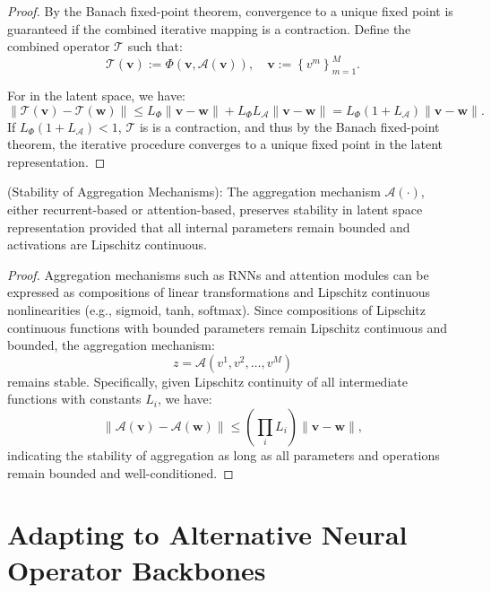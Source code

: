\begin{proof}
	By the Banach fixed-point theorem, convergence to a unique fixed point is guaranteed if the combined iterative mapping is a contraction. Define the combined operator $\mathcal{T}$ such that:
	\[
		\mathcal{T}(\mathbf{v}):=\Phi(\mathbf{v}, \mathcal{A}(\mathbf{v})), \quad \mathbf{v}:=\left\{v^m\right\}_{m=1}^M .
	\]
	
	For  in the latent space, we have:
	\[
		\|\mathcal{T}(\mathbf{v})-\mathcal{T}(\mathbf{w})\| \leq L_{\Phi}\|\mathbf{v}-\mathbf{w}\|+L_{\Phi} L_{\mathcal{A}}\|\mathbf{v}-\mathbf{w}\|=L_{\Phi}\left(1+L_{\mathcal{A}}\right)\|\mathbf{v}-\mathbf{w}\| .
	\]
	If $L_{\Phi}\left(1+L_{\mathcal{A}}\right)<1$, $\mathcal{T}$ is is a contraction, and thus by the Banach fixed-point theorem, the iterative procedure converges to a unique fixed point in the latent representation.
\end{proof}

\begin{theorem}
	 (Stability of Aggregation Mechanisms):
	The aggregation mechanism $\mathcal{A}(\cdot)$, either recurrent-based or attention-based, preserves stability in latent space representation provided that all internal parameters remain bounded and activations are Lipschitz continuous. 
\end{theorem}

\begin{proof}
	Aggregation mechanisms such as RNNs and attention modules can be expressed as compositions of linear transformations and Lipschitz continuous nonlinearities (e.g., sigmoid, tanh, softmax). Since compositions of Lipschitz continuous functions with bounded parameters remain Lipschitz continuous and bounded, the aggregation mechanism:
	\[
		z=\mathcal{A}\left(v^1, v^2, \ldots, v^M\right)
	\]
	remains stable. Specifically, given Lipschitz continuity of all intermediate functions with constants $L_i$, we have:
	\[
		\|\mathcal{A}(\mathbf{v})-\mathcal{A}(\mathbf{w})\| \leq\left(\prod_i L_i\right)\|\mathbf{v}-\mathbf{w}\|,
	\]
	indicating the stability of aggregation as long as all parameters and operations remain bounded and well-conditioned.
\end{proof}


\newpage
\section{Adapting \ours to Alternative Neural Operator Backbones}
\label{sec:appx-adapting}

